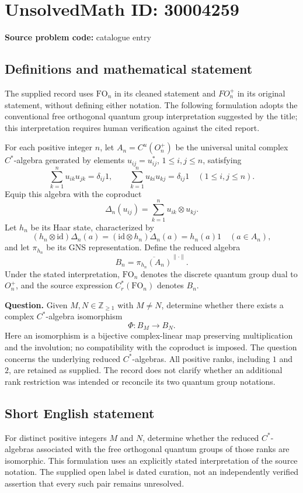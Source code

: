\documentclass[11pt]{article}
\newcommand{\Z}{\mathbb{Z}}
\begin{document}
\section*{UnsolvedMath ID: 30004259}
\textbf{Source problem code:} catalogue entry
\subsection{Definitions and mathematical statement}
The supplied record uses \(\mathrm{FO}_n\) in its cleaned statement and \(F O_n^+\) in its original statement, without defining either notation. The following formulation adopts the conventional free orthogonal quantum group interpretation suggested by the title; this interpretation requires human verification against the cited report.

For each positive integer \(n\), let \(A_n=C^u(O_n^+)\) be the universal unital complex \(C^*\)-algebra generated by elements \(u_{ij}=u_{ij}^*\), \(1\leq i,j\leq n\), satisfying
\[
\sum_{k=1}^n u_{ik}u_{jk}=\delta_{ij}1,
\qquad
\sum_{k=1}^n u_{ki}u_{kj}=\delta_{ij}1
\quad (1\leq i,j\leq n).
\]
Equip this algebra with the coproduct
\[
\Delta_n(u_{ij})=\sum_{k=1}^n u_{ik}\otimes u_{kj}.
\]
Let \(h_n\) be its Haar state, characterized by
\[
(h_n\otimes\mathrm{id})\Delta_n(a)
=(\mathrm{id}\otimes h_n)\Delta_n(a)
=h_n(a)1
\quad(a\in A_n),
\]
and let \(\pi_{h_n}\) be its GNS representation. Define the reduced algebra
\[
B_n=\overline{\pi_{h_n}(A_n)}^{\lVert\cdot\rVert}.
\]
Under the stated interpretation, \(\mathrm{FO}_n\) denotes the discrete quantum group dual to \(O_n^+\), and the source expression \(C_r^*(\mathrm{FO}_n)\) denotes \(B_n\).

\textbf{Question.} Given \(M,N\in\Z_{\geq 1}\) with \(M\neq N\), determine whether there exists a complex \(C^*\)-algebra isomorphism
\[
\Phi:B_M\longrightarrow B_N.
\]
Here an isomorphism is a bijective complex-linear map preserving multiplication and the involution; no compatibility with the coproduct is imposed. The question concerns the underlying reduced \(C^*\)-algebras. All positive ranks, including \(1\) and \(2\), are retained as supplied. The record does not clarify whether an additional rank restriction was intended or reconcile its two quantum group notations.
\subsection{Short English statement}
For distinct positive integers \(M\) and \(N\), determine whether the reduced \(C^*\)-algebras associated with the free orthogonal quantum groups of those ranks are isomorphic. This formulation uses an explicitly stated interpretation of the source notation. The supplied open label is dated curation, not an independently verified assertion that every such pair remains unresolved.
\end{document}
